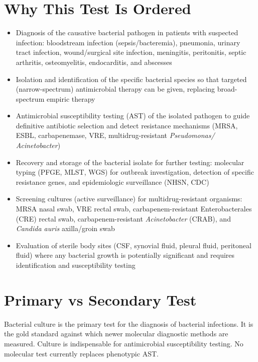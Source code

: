 \section*{Why This Test Is Ordered}
\begin{itemize}
  \item Diagnosis of the causative bacterial pathogen in patients with suspected infection: bloodstream infection (sepsis/bacteremia), pneumonia, urinary tract infection, wound/surgical site infection, meningitis, peritonitis, septic arthritis, osteomyelitis, endocarditis, and abscesses
  \item Isolation and identification of the specific bacterial species so that targeted (narrow-spectrum) antimicrobial therapy can be given, replacing broad-spectrum empiric therapy
  \item Antimicrobial susceptibility testing (AST) of the isolated pathogen to guide definitive antibiotic selection and detect resistance mechanisms (MRSA, ESBL, carbapenemase, VRE, multidrug-resistant \textit{Pseudomonas/ Acinetobacter})
  \item Recovery and storage of the bacterial isolate for further testing: molecular typing (PFGE, MLST, WGS) for outbreak investigation, detection of specific resistance genes, and epidemiologic surveillance (NHSN, CDC)
  \item Screening cultures (active surveillance) for multidrug-resistant organisms: MRSA nasal swab, VRE rectal swab, carbapenem-resistant Enterobacterales (CRE) rectal swab, carbapenem-resistant \textit{Acinetobacter} (CRAB), and \textit{Candida auris} axilla/groin swab
  \item Evaluation of sterile body sites (CSF, synovial fluid, pleural fluid, peritoneal fluid) where any bacterial growth is potentially significant and requires identification and susceptibility testing
\end{itemize}

\section*{Primary vs Secondary Test}
Bacterial culture is the primary test for the diagnosis of bacterial infections. It is the gold standard against which newer molecular diagnostic methods are measured. Culture is indispensable for antimicrobial susceptibility testing. No molecular test currently replaces phenotypic AST.

